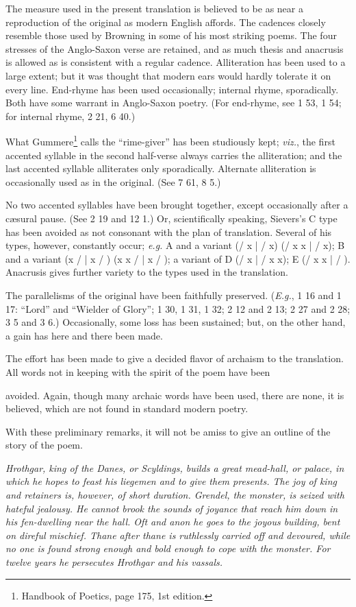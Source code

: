 The measure used in the present translation is believed to be as near a
reproduction of the original as modern English affords. The cadences closely
resemble those used by Browning in some of his most striking poems. The
four stresses of the Anglo-Saxon verse are retained, and as much thesis and
anacrusis is allowed as is consistent with a regular cadence. Alliteration has
been used to a large extent; but it was thought that modern ears would hardly
tolerate it on every line. End-rhyme has been used occasionally; internal
rhyme, sporadically. Both have some warrant in Anglo-Saxon poetry. (For
end-rhyme, see 1 53, 1 54; for internal rhyme, 2 21, 6 40.)

What Gummere\footnote{Handbook of Poetics, page 175, 1st edition.} calls the “rime-giver” has been studiously kept; \emph{viz.}, the
first accented syllable in the second half-verse always carries the alliteration;
and the last accented syllable alliterates only sporadically. Alternate alliteration
is occasionally used as in the original. (See 7 61, 8 5.)

No two accented syllables have been brought together, except occasionally
after a cæsural pause. (See 2 19 and 12 1.)
Or, scientifically speaking, Sievers’s
C type has been avoided as not consonant with the plan of translation. Several
of his types, however, constantly occur; \emph{e.g.} A and a variant
(/ x | / x) (/ x x | / x);
B and a variant (x / | x / ) (x x / | x / ); a variant of D (/ x | / x x);
E (/ x x | / ). Anacrusis gives further variety to the types used in the translation.

The parallelisms of the original have been faithfully preserved. (\emph{E.g.}, 1 16
and 1 17: “Lord” and “Wielder of Glory”; 1 30, 1 31, 1 32; 2 12 and 2 13;
2 27 and 2 28; 3 5 and 3 6.) Occasionally, some loss has been sustained; but,
on the other hand, a gain has here and there been made.

The effort has been made to give a decided flavor of archaism to the translation.
All words not in keeping with the spirit of the poem have been

avoided. Again, though many archaic words have been used, there are none,
it is believed, which are not found in standard modern poetry.

With these preliminary remarks, it will not be amiss to give an outline of
the story of the poem.


\emph{Hrothgar, king of the Danes, or Scyldings, builds a great mead-hall, or
palace, in which he hopes to feast his liegemen and to give them presents. The
joy of king and retainers is, however, of short duration. Grendel, the monster,
is seized with hateful jealousy. He cannot brook the sounds of joyance that
reach him down in his fen-dwelling near the hall. Oft and anon he goes to
the joyous building, bent on direful mischief. Thane after thane is ruthlessly
carried off and devoured, while no one is found strong enough and bold enough
to cope with the monster. For twelve years he persecutes Hrothgar and his
vassals.}

